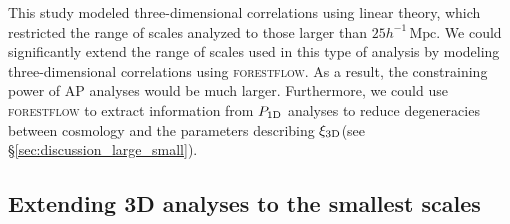 \documentclass{aa}
\newcommand{\poned}{\ensuremath{P_{\rm 1D}}\xspace}
\newcommand{\xithreed}{\ensuremath{\xi_{\rm 3D}}\xspace}
\newcommand{\forestflow}{\textsc{forestflow}\xspace}
\newcommand{\hMpc}{h^{-1}\,\mathrm{Mpc}}
\begin{document}
This study modeled three-dimensional correlations using linear theory, which restricted the range of scales analyzed to those larger than $25 \hMpc$. We could significantly extend the range of scales used in this type of analysis by modeling three-dimensional correlations using \forestflow. As a result, the constraining power of AP analyses would be much larger. Furthermore, we could use \forestflow to extract information from \poned analyses to reduce degeneracies between cosmology and the parameters describing \xithreed (see \S\ref{sec:discussion_large_small}).


\subsection{Extending 3D analyses to the smallest scales}
\end{document}
